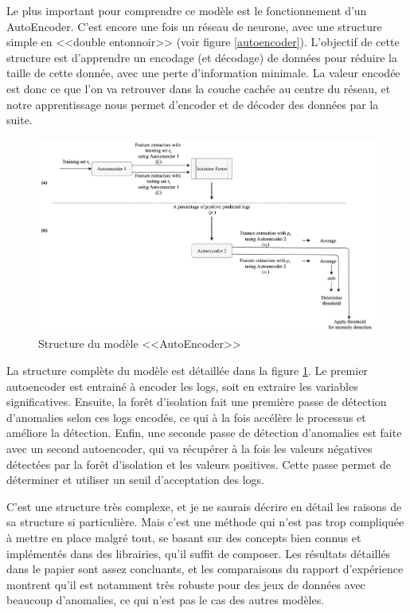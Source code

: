 \documentclass[openany, 11pt]{memoir}
\begin{document}
\bigskip
Le plus important pour comprendre ce modèle est le fonctionnement d'un AutoEncoder. C'est encore une fois un réseau de neurone, avec une structure simple en <<double entonnoir>> (voir figure \ref{autoencoder}). L'objectif de cette structure est d'apprendre un encodage (et décodage) de données pour réduire la taille de cette donnée, avec une perte d'information minimale. La valeur encodée est donc ce que l'on va retrouver dans la couche cachée au centre du réseau, et notre apprentissage nous permet d'encoder et de décoder des données par la suite.

\begin{figure}[ht]
	\centering
	\includegraphics[width=\textwidth]{images/modeleautoencoder.png}
	\caption{Structure du modèle <<AutoEncoder>>}
	\label{modeleautoencoder}
\end{figure}

\bigskip
La structure complète du modèle est détaillée dans la figure \ref{modeleautoencoder}. Le premier autoencoder est entrainé à encoder les \glspl{log}, soit en extraire les variables significatives. Ensuite, la forêt d'isolation fait une première passe de détection d'anomalies selon ces logs encodés, ce qui à la fois accélère le processus et améliore la détection. Enfin, une seconde passe de détection d'anomalies est faite avec un second autoencoder, qui va récupérer à la fois les valeurs négatives détectées par la forêt d'isolation et les valeurs positives. Cette passe permet de déterminer et utiliser un seuil d'acceptation des logs.

C'est une structure très complexe, et je ne saurais décrire en détail les raisons de sa structure si particulière. Mais c'est une méthode qui n'est pas trop compliquée à mettre en place malgré tout, se basant sur des concepts bien connus et implémentés dans des librairies, qu'il suffit de composer. Les résultats détaillés dans le papier sont assez concluants, et les comparaisons du rapport d'expérience \cite{experiencereport} montrent qu'il est notamment très robuste pour des jeux de données avec beaucoup d'anomalies, ce qui n'est pas le cas des autres modèles.
\end{document}
